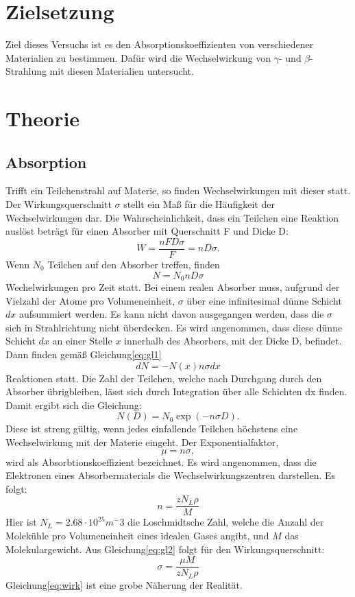 \section{Zielsetzung}
Ziel dieses Versuchs ist es den Absorptionskoeffizienten von verschiedener Materialien zu bestimmen.
Dafür wird die Wechselwirkung von $\gamma$- und $\beta$-Strahlung mit diesen Materialien untersucht.
\section{Theorie}
\label{sec:Theorie}
\subsection{Absorption}
Trifft ein Teilchenstrahl auf Materie, so finden Wechselwirkungen mit dieser statt.
Der Wirkungsquerschnitt $\sigma$ stellt ein Maß für die Häufigkeit der Wechselwirkungen dar.
Die Wahrscheinlichkeit, dass ein Teilchen eine Reaktion auslöst beträgt für einen Absorber mit Querschnitt F und Dicke D:
\begin{equation}
  W= \frac{nFD\sigma}{F}= nD \sigma    .
\end{equation}
Wenn $N_0$ Teilchen auf den Absorber treffen, finden
\begin{equation}
  N = N_0 nD \sigma
  \label{eq:gl1}
\end{equation}
Wechelwirkungen pro Zeit statt.
Bei einem realen Absorber muss, aufgrund der Vielzahl der Atome pro Volumeneinheit, $\sigma$ über eine infinitesimal dünne Schicht $dx$ aufsummiert werden.
Es kann nicht davon ausgegangen werden, dass die $\sigma$ sich in Strahlrichtung nicht überdecken.
Es wird angenommen, dass diese dünne Schicht $dx$ an einer Stelle $x$ innerhalb des Absorbers, mit der Dicke D, befindet.
Dann finden gemäß Gleichung\eqref{eq:gl1}
\begin{equation}
  dN = -N(x) n \sigma dx
\end{equation}
Reaktionen statt.
Die Zahl der Teilchen, welche nach Durchgang durch den Absorber übrigbleiben, lässt sich durch Integration über alle Schichten dx finden.
Damit ergibt sich die Gleichung:
\begin{equation}
  N(D) = N_0 \exp(-n\sigma D)  .
\end{equation}
Diese ist streng gültig, wenn jedes einfallende Teilchen höchstens eine Wechselwirkung mit der Materie eingeht.
Der Exponentialfaktor,
\begin{equation}
  \mu = n \sigma   ,
\end{equation}
wird als Absorbtionskoeffizient bezeichnet.
Es wird angenommen, dass die Elektronen eines Absorbermaterials die Wechselwirkungszentren darstellen.
Es folgt:
\begin{equation}
  n= \frac{z N_L \rho}{M}
  \label{eq:gl2}
\end{equation}
Hier ist $N_L=2.68\cdot 10^{25} m^-3$\cite{Nl} die Loschmidtsche Zahl, welche die Anzahl der Molekühle pro Volumeneinheit eines idealen Gases angibt, und $M$ das Molekulargewicht.
Aus Gleichung\eqref{eq:gl2} folgt für den Wirkungsquerschnitt:
\begin{equation}
  \sigma=\frac{\mu M}{z N_L \rho}
  \label{eq:wirk}
\end{equation}
Gleichung\eqref{eq:wirk} ist eine grobe Näherung der Realität.
